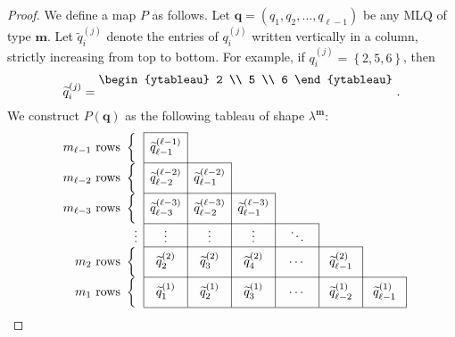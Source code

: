 \documentclass[reqno]{amsart}
\newcommand{\0}{\phantom{c}}
\newcommand{\mm}{\mathbf{m}}
\newcommand{\qq}{\mathbf{q}}
\newcommand{\set}[1]{\left\{ #1 \right\}}
\newcommand{\tup}[1]{\left( #1 \right)}
\theoremstyle{plain}
\theoremstyle{definition}
\numberwithin{equation}{section}
\begin{document}
\begin{proof}
We define a map $P$ as follows.
Let $\qq = \tup{q_1, q_2, \dotsc, q_{\ell-1}}$ be any MLQ of type $\mm$.
Let $\widetilde{q}_i^{(j)}$ denote the entries of $q_i^{(j)}$ written vertically in a column, strictly increasing from top to bottom.
For example, if $q_i^{(j)} = \set{2,5,6}$, then
\[
\widetilde{q}_i^{(j)} = \raisebox{10pt}{$\begin{ytableau} 2 \\ 5 \\ 6 \end{ytableau}$}\ .
\]
We construct $P(\qq)$ as the following tableau of shape $\lambda^{\mm}$:
\begin{equation}
\label{pf.lem:determinant_form.bij1.visual}
\begin{array}[c]{r|c|ccc@{\hspace{30pt}}c@{\hspace{35pt}}c@{\hspace{35pt}}}
\cline{2-2}%
m_{\ell-1} \text{ rows } \left\{ \vphantom{\dfrac{2^2}{2^2}}\right.
    & \widetilde{q}_{\ell-1}^{(\ell-1)} &  &  &  &  & \\\cline{2-3}
m_{\ell-2} \text{ rows } \left\{ \vphantom{\dfrac{2^2}{2^2}}\right.
    & \widetilde{q}_{\ell-2}^{(\ell-2)} & \widetilde{q}_{\ell-1}^{(\ell-2)} & \multicolumn{1}{|c}{} &  &  & \\\cline{2-4}
m_{\ell-3} \text{ rows } \left\{  \vphantom{\dfrac{2^2}{2^2}}\right.
    & \widetilde{q}_{\ell-3}^{(\ell-3)} & \widetilde{q}_{\ell-2}^{(\ell-3)} & \multicolumn{1}{|c}{\widetilde{q}_{\ell-1}^{(  \ell-3)}} & \multicolumn{1}{|c}{} &  & \\\cline{2-5}%
\vdots & \mathbf{\vdots} & \mathbf{\vdots} & \multicolumn{1}{|c}{\vdots} & \multicolumn{1}{|c|}{\ddots} &  & \\\cline{2-6}
m_2 \text{ rows } \left\{  \vphantom{\dfrac{2^2}{2^2}}\right.
    & \widetilde{q}_2^{(2)} & \widetilde{q}_{3}^{(2)} & \multicolumn{1}{|c}{\widetilde{q}_{4}^{(2)}} & \multicolumn{1}{|c}{\cdots} & \multicolumn{1}{|c}{\widetilde{q}_{\ell-1}^{(2)}} & \multicolumn{1}{|c}{}\\\cline{2-7}
m_1 \text{ rows } \left\{ \vphantom{\dfrac{2^2}{2^2}}\right.
    & \widetilde{q}_1^{(1)} & \widetilde{q}_2^{(1)} & \multicolumn{1}{|c}{\widetilde{q}_{3}^{(1)}} & \multicolumn{1}{|c}{\cdots} & \multicolumn{1}{|c}{\widetilde{q}_{\ell-2}^{(1)}} & \multicolumn{1}{|c|}{\widetilde{q}_{\ell-1}^{(1)}}\\\cline{2-7}
\end{array}
\end{equation}

\end{proof}
\end{document}
